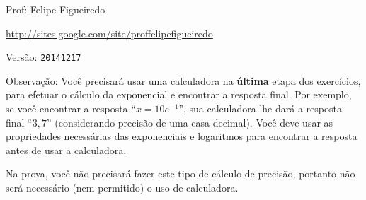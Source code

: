 \documentclass[a4paper]{article}
\begin{document}
\parbox[c]{.825\textwidth}{\raggedright%
{Prof: Felipe Figueiredo\par}
{\url{http://sites.google.com/site/proffelipefigueiredo}\par}
}

Versão: \verb|20141217|

\vspace{0.5cm}


Observação: Você precisará usar uma calculadora na {\bf última} etapa
dos exercícios, para efetuar o cálculo da exponencial e encontrar a
resposta final. Por exemplo, se você encontrar a resposta
``$x=10e^{-1}$'', sua calculadora lhe dará a resposta final ``$3,7$''
(considerando precisão de uma casa decimal). Você deve usar as
propriedades necessárias das exponenciais e logaritmos para encontrar
a resposta antes de usar a calculadora.

Na prova, você não precisará fazer este tipo de cálculo de precisão,
portanto não será necessário (nem permitido) o uso de calculadora.
\end{document}

